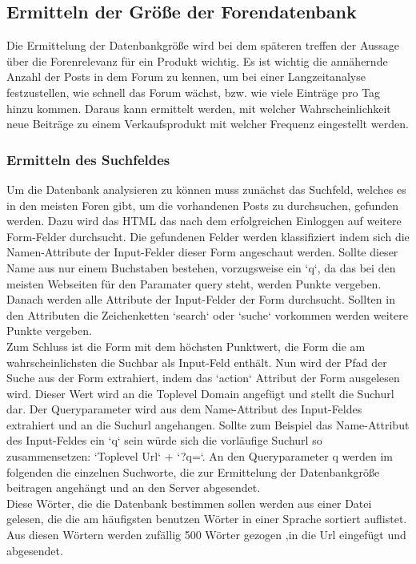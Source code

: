 
\subsection{Ermitteln der Größe der Forendatenbank}
Die Ermittelung der Datenbankgröße wird bei dem späteren treffen der Aussage über die Forenrelevanz für ein Produkt wichtig.
Es ist wichtig die annähernde Anzahl der Posts in dem Forum zu kennen, um bei einer Langzeitanalyse festzustellen, wie schnell das Forum wächst, bzw. wie viele Einträge pro Tag hinzu kommen. Daraus kann ermittelt werden, mit welcher Wahrscheinlichkeit neue Beiträge zu einem Verkaufsprodukt mit welcher Frequenz eingestellt werden.\\
\subsubsection{Ermitteln des Suchfeldes}
Um die Datenbank analysieren zu können muss zunächst das Suchfeld, welches es in den meisten Foren gibt, um die vorhandenen Posts zu durchsuchen, gefunden werden.
Dazu wird das HTML das nach dem erfolgreichen Einloggen auf weitere Form-Felder durchsucht. Die gefundenen Felder werden klassifiziert indem sich die Namen-Attribute der Input-Felder dieser Form angeschaut werden. Sollte dieser Name aus nur einem Buchstaben bestehen, vorzugsweise ein `q`, da das bei den meisten Webseiten für den Paramater query steht, werden Punkte vergeben.
Danach werden alle Attribute der Input-Felder der Form durchsucht. Sollten in den Attributen die Zeichenketten `search` oder `suche` vorkommen werden weitere Punkte vergeben.\\
Zum Schluss ist die Form mit dem höchsten Punktwert, die Form die am wahrscheinlichsten die Suchbar als Input-Feld enthält.
Nun wird der Pfad der Suche aus der Form extrahiert, indem das `action` Attribut der Form ausgelesen wird. Dieser Wert wird an die Toplevel Domain angefügt und stellt die Suchurl dar. Der Queryparameter wird aus dem Name-Attribut des Input-Feldes extrahiert und an die Suchurl angehangen. Sollte zum Beispiel das Name-Attribut des Input-Feldes ein `q` sein würde sich die vorläufige Suchurl so zusammensetzen: `Toplevel Url` + `?q=`. An den Queryparameter q werden im folgenden die einzelnen Suchworte, die zur Ermittelung der Datenbankgröße beitragen angehängt und an den Server abgesendet.\\
Diese Wörter, die die Datenbank bestimmen sollen werden aus einer Datei gelesen, die die am häufigsten benutzen Wörter in einer Sprache sortiert auflistet. Aus diesen Wörtern werden zufällig 500 Wörter gezogen ,in die Url eingefügt und abgesendet.\\
